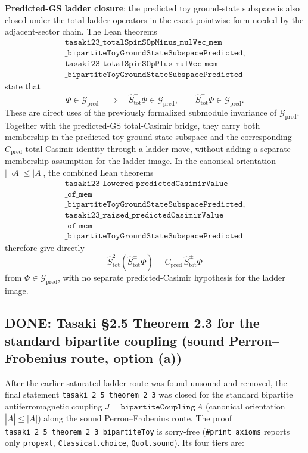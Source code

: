 \documentclass[a4paper,11pt]{article}
\begin{document}
\textbf{Predicted-GS ladder closure}: the predicted toy ground-state
subspace is also closed under the total ladder operators in the exact
pointwise form needed by the adjacent-sector chain.  The Lean theorems
\[
\begin{gathered}
\texttt{tasaki23\_totalSpinSOpMinus\_mulVec\_mem}\\
\texttt{\_bipartiteToyGroundStateSubspacePredicted},\\
\texttt{tasaki23\_totalSpinSOpPlus\_mulVec\_mem}\\
\texttt{\_bipartiteToyGroundStateSubspacePredicted}
\end{gathered}
\]
state that
\[
  \Phi\in\mathcal G_{\mathrm{pred}}
  \quad\Longrightarrow\quad
  \hat S^-_{\mathrm{tot}}\Phi\in\mathcal G_{\mathrm{pred}},
  \qquad
  \hat S^+_{\mathrm{tot}}\Phi\in\mathcal G_{\mathrm{pred}} .
\]
These are direct uses of the previously formalized submodule
invariance of \(\mathcal G_{\mathrm{pred}}\).  Together with the
predicted-GS total-Casimir bridge, they carry both membership in the
predicted toy ground-state subspace and the corresponding
\(C_{\mathrm{pred}}\) total-Casimir identity through a ladder move,
without adding a separate membership assumption for the ladder image.
In the canonical orientation \(|\neg A|\le |A|\), the combined Lean
theorems
\[
\begin{gathered}
\texttt{tasaki23\_lowered\_predictedCasimirValue}\\
\texttt{\_of\_mem}\\
\texttt{\_bipartiteToyGroundStateSubspacePredicted},\\
\texttt{tasaki23\_raised\_predictedCasimirValue}\\
\texttt{\_of\_mem}\\
\texttt{\_bipartiteToyGroundStateSubspacePredicted}
\end{gathered}
\]
therefore give directly
\[
  \hat S_{\mathrm{tot}}^2(\hat S^\pm_{\mathrm{tot}}\Phi)
    =
  C_{\mathrm{pred}}\,\hat S^\pm_{\mathrm{tot}}\Phi
\]
from \(\Phi\in\mathcal G_{\mathrm{pred}}\), with no separate
predicted-Casimir hypothesis for the ladder image.

\subsection*{DONE: Tasaki §2.5 Theorem 2.3 for the standard bipartite
                coupling (sound Perron--Frobenius route, option (a))}
\label{subsec:tasaki-2-5-theorem-2-3-toy-done}

After the earlier saturated-ladder route was found unsound and removed,
the final statement \texttt{tasaki\_2\_5\_theorem\_2\_3} was closed for
the standard bipartite antiferromagnetic coupling
\(J=\texttt{bipartiteCoupling}\,A\) (canonical orientation
\(|\bar A|\le|A|\)) along the sound Perron--Frobenius route.  The proof
\texttt{tasaki\_2\_5\_theorem\_2\_3\_bipartiteToy} is sorry-free
(\texttt{\#print axioms} reports only \texttt{propext},
\texttt{Classical.choice}, \texttt{Quot.sound}).  Its four tiers are:
\end{document}
